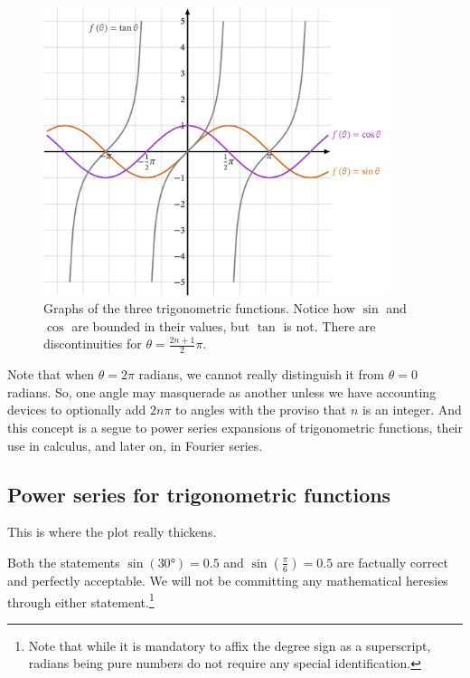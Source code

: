 \documentclass[
  a4paper,
]{article}
\begin{document}
\begin{figure}
\hypertarget{fig:threegraph}{%
\centering
\includegraphics[width=0.9\textwidth,height=\textheight]{images/threegraph.png}
\caption{Graphs of the three trigonometric functions. Notice how
\(\sin\) and \(\cos\) are bounded in their values, but \(\tan\) is not.
There are discontinuities for
\(\theta=\frac{2n+1}{2}\pi\).}\label{fig:threegraph}
}
\end{figure}

Note that when \(\theta = 2\pi\) radians, we cannot really distinguish
it from \(\theta=0\) radians. So, one angle may masquerade as another
unless we have accounting devices to optionally add \(2n\pi\) to angles
with the proviso that \(n\) is an integer. And this concept is a segue
to power series expansions of trigonometric functions, their use in
calculus, and later on, in Fourier series.

\hypertarget{power-series-for-trigonometric-functions}{%
\subsection{Power series for trigonometric
functions}\label{power-series-for-trigonometric-functions}}

This is where the plot really thickens.

Both the statements \(\sin(30°)=0.5\) and \(\sin(\frac{\pi}{6})=0.5\)
are factually correct and perfectly acceptable. We will not be
committing any mathematical heresies through either
statement.\footnote{Note that while it is mandatory to affix the degree
  sign as a superscript, radians being pure numbers do not require any
  special identification.}
\end{document}
